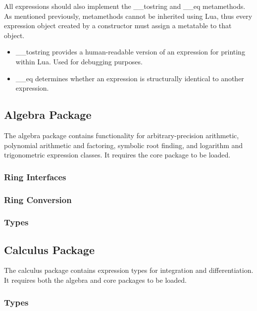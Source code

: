\documentclass{article}
\begin{document}
All expressions should also implement the {\ttfamily \_\_tostring} and {\ttfamily \_\_eq} metamethods. As mentioned previously, metamethods cannot be inherited using Lua, thus every expression object created by a constructor must assign a metatable to that object.

\begin{itemize}
    \item {\ttfamily \_\_tostring} provides a human-readable version of an expression for printing within Lua. Used for debugging purposes.
    
    \item {\ttfamily \_\_eq} determines whether an expression is structurally identical to another expression.
\end{itemize}

\subsection{Algebra Package}

The algebra package contains functionality for arbitrary-precision arithmetic, polynomial arithmetic and factoring, symbolic root finding, and logarithm and trigonometric expression classes. It requires the core package to be loaded.

\subsubsection{Ring Interfaces}



\subsubsection{Ring Conversion}

\subsubsection{Types}

\subsection{Calculus Package}

The calculus package contains expression types for integration and differentiation. It requires both the algebra and core packages to be loaded.

\subsubsection{Types}
\end{document}
